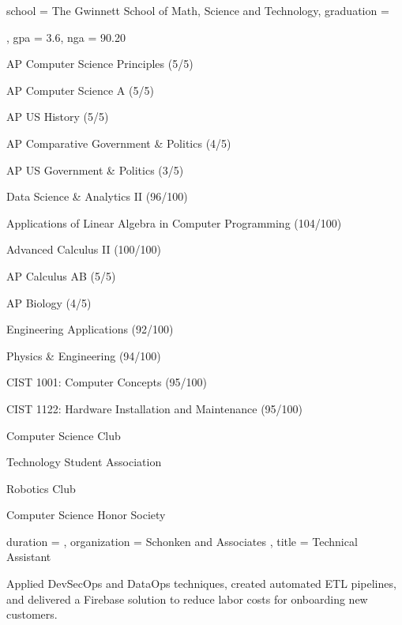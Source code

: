 \documentclass[sidebar-width=2.25in, primary=slate]{clean-resume}
\begin{document}
  \begin{main}
    
    \education
    {
      school = {The Gwinnett School of Math, Science and Technology},
      graduation = {\date{2024/5}},
      gpa = 3.6,
      nga = 90.20
    }
  
    \begin{lst}
      [
        title = {Relevant Coursework},
        columns = 2,
    	]
      \item AP Computer Science Principles (5/5)
      \item AP Computer Science A (5/5)
      \item AP US History (5/5)
      \item AP Comparative Government \& Politics (4/5)
      \item AP US Government \& Politics (3/5)
      \item Data Science \& Analytics II (96/100)
      \item Applications of Linear Algebra in Computer Programming (104/100)
      \item Advanced Calculus II (100/100)
      \item AP Calculus AB (5/5)
      \item AP Biology (4/5)
      \item Engineering Applications (92/100)
      \item Physics \& Engineering (94/100)
      \item CIST 1001: Computer Concepts (95/100)
      \item CIST 1122: Hardware Installation and Maintenance (95/100)
    \end{lst}
    
    \begin{lst}
      [
        title = Clubs,
        columns = 2,
  	]
      \item Computer Science Club
      \item Technology Student Association
      \item Robotics Club
      \item Computer Science Honor Society
    \end{lst}
    
    
    \begin{experience}
      {
        duration = {  },
        organization = { Schonken and Associates },
        title = { Technical Assistant }
      }
      \item Applied DevSecOps and DataOps techniques, created automated ETL pipelines, and delivered a Firebase solution to reduce labor costs for onboarding new customers.
    \end{experience}
    

\end{main}
\end{document}
